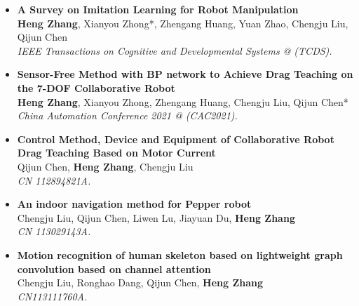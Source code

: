 \documentclass{resume}
\begin{document}
\begin{itemize}
\item \textbf{A Survey on Imitation Learning for Robot Manipulation} \\
  \footnotesize{\textbf{Heng Zhang}, Xianyou Zhong*, Zhengang Huang, Yuan Zhao, Chengju Liu, Qijun Chen} \\
  \footnotesize{\textit{ IEEE Transactions on Cognitive and Developmental Systems @ (TCDS).}}
   
\item \textbf{Sensor-Free Method with BP network to Achieve Drag Teaching on the 7-DOF Collaborative Robot} \\
  \footnotesize{\textbf{Heng Zhang}, Xianyou Zhong, Zhengang Huang, Chengju Liu, Qijun Chen*} \\
  \footnotesize{\textit{ China Automation Conference 2021 @ (CAC2021).}}

\item \textbf{Control Method, Device and Equipment of Collaborative Robot Drag Teaching Based on Motor Current}\quad {}\\
  \footnotesize{Qijun Chen, \textbf{Heng Zhang}, Chengju Liu}\\
  \footnotesize{\textit{ CN 112894821A.}}
  
\item \textbf{An indoor navigation method for Pepper robot}\quad {}\\
  \footnotesize{Chengju Liu, Qijun Chen, Liwen Lu, Jiayuan Du, \textbf{Heng Zhang}}\\
  \footnotesize{\textit{ CN 113029143A.}} 
  
\item \textbf{Motion recognition of human skeleton based on lightweight graph convolution based on channel attention}\quad {}\\
  \footnotesize{ Chengju Liu, Ronghao Dang, Qijun Chen, \textbf{Heng Zhang}}\\
  \footnotesize{\textit{ CN113111760A.}}
  

\end{itemize}
\end{document}
